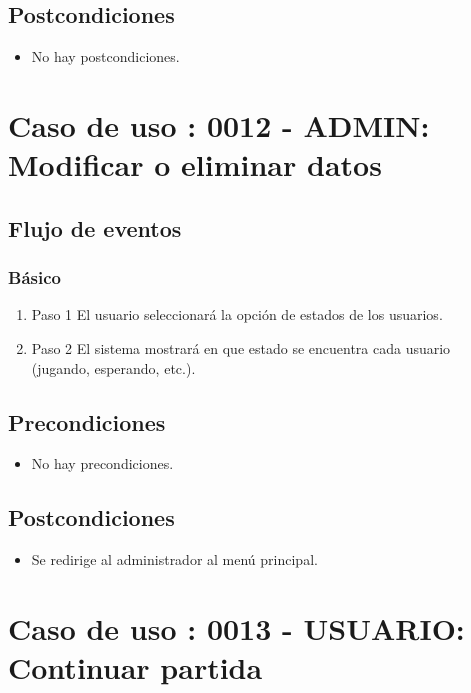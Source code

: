 \subsection{Postcondiciones}
\begin{itemize}
\item No hay postcondiciones.
\end{itemize}



\section{Caso de uso : 0012 - ADMIN: Modificar o eliminar datos}\label{sec:uc0}

\subsection{Flujo de eventos}

\subsubsection{Básico}

\begin{enumerate}
\item Paso 1
El usuario seleccionará la opción de estados de los usuarios.
\item Paso 2
El sistema mostrará en que estado se encuentra cada usuario (jugando, esperando, etc.).
\end{enumerate}

\subsection{Precondiciones}
\begin{itemize}
\item No hay precondiciones.
\end{itemize}
\subsection{Postcondiciones}
\begin{itemize}
\item Se redirige al administrador al menú principal.
\end{itemize}



\section{Caso de uso : 0013 - USUARIO: Continuar partida}\label{sec:uc0}

